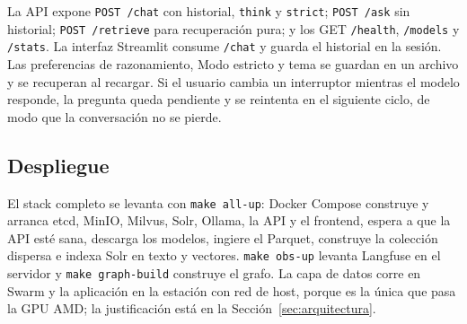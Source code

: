 La API expone \texttt{POST /chat} con historial, \texttt{think} y \texttt{strict}; \texttt{POST /ask} sin historial; \texttt{POST /retrieve} para recuperaci\'on pura; y los GET \texttt{/health}, \texttt{/models} y \texttt{/stats}. La interfaz Streamlit consume \texttt{/chat} y guarda el historial en la sesi\'on. Las preferencias de razonamiento, Modo estricto y tema se guardan en un archivo y se recuperan al recargar. Si el usuario cambia un interruptor mientras el modelo responde, la pregunta queda pendiente y se reintenta en el siguiente ciclo, de modo que la conversaci\'on no se pierde.

\subsection{Despliegue}

El stack completo se levanta con \texttt{make all-up}: Docker Compose construye y arranca etcd, MinIO, Milvus, Solr, Ollama, la API y el frontend, espera a que la API est\'e sana, descarga los modelos, ingiere el Parquet, construye la colecci\'on dispersa e indexa Solr en texto y vectores. \texttt{make obs-up} levanta Langfuse en el servidor y \texttt{make graph-build} construye el grafo. La capa de datos corre en Swarm y la aplicaci\'on en la estaci\'on con red de host, porque es la \'unica que pasa la GPU AMD; la justificaci\'on est\'a en la Secci\'on~\ref{sec:arquitectura}.
